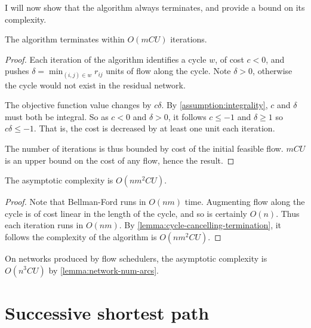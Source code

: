 I will now show that the algorithm always terminates, and provide a bound on its complexity.\\

\begin{lemma} \label{lemma:cycle-cancelling-termination}
    The algorithm terminates within $O(mCU)$ iterations\footnotemark.
\end{lemma}
\begin{proof}
    Each iteration of the algorithm identifies a cycle $w$, of cost $c < 0$, and pushes $\delta = \min_{(i,j) \in w} r_{ij}$ units of flow along the cycle. Note $\delta > 0$, otherwise the cycle would not exist in the residual network. 
    
    The objective function value changes by $c\delta$.  By \cref{assumption:integrality}, $c$ and $\delta$ must both be integral. So as $c < 0$ and $\delta > 0$, it follows $c \leq -1$ and $\delta \geq 1$ so $c\delta \leq -1$. That is, the cost is decreased by at least one unit each iteration.
    
    The number of iterations is thus bounded by cost of the initial feasible flow. $mCU$ is an upper bound on the cost of any flow, hence the result.
\end{proof}

\begin{thm}
    \label{thm:cycle-cancelling-complexity}
    The asymptotic complexity is $O(nm^2CU)$.
\end{thm}
\begin{proof}
    Note that Bellman-Ford runs in $O(nm)$ time. Augmenting flow along the cycle is of cost linear in the length of the cycle, and so is certainly $O(n)$. Thus each iteration runs in $O(nm)$. By \cref{lemma:cycle-cancelling-termination}, it follows the complexity of the algorithm is $O(nm^2CU)$.
\end{proof}

\begin{remark}
    On networks produced by flow schedulers, the asymptotic complexity is $O(n^3CU)$ by \cref{lemma:network-num-arcs}.
\end{remark}

\section{Successive shortest path} \label{appendix:impl-ssp}

